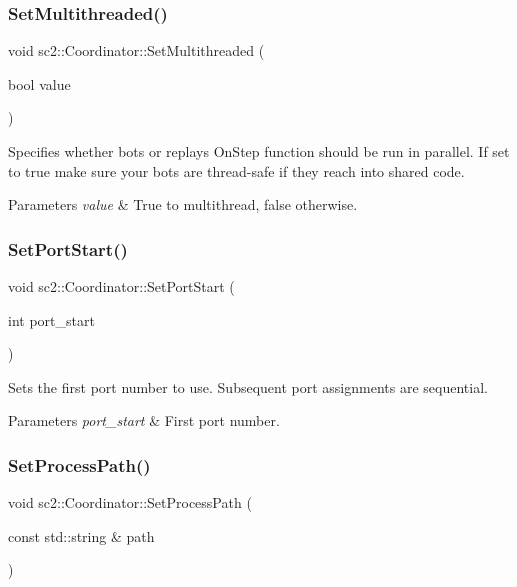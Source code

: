 \subsubsection{\texorpdfstring{Set\+Multithreaded()}{SetMultithreaded()}}
{\footnotesize\ttfamily void sc2\+::\+Coordinator\+::\+Set\+Multithreaded (\begin{DoxyParamCaption}\item[{bool}]{value }\end{DoxyParamCaption})}

Specifies whether bots or replays On\+Step function should be run in parallel. If set to true make sure your bots are thread-\/safe if they reach into shared code. 
\begin{DoxyParams}{Parameters}
{\em value} & True to multithread, false otherwise. \\
\hline
\end{DoxyParams}
\mbox{\label{classsc2_1_1_coordinator_aaad48921bac2f4f84471de5e9cff75d5}} 
\subsubsection{\texorpdfstring{Set\+Port\+Start()}{SetPortStart()}}
{\footnotesize\ttfamily void sc2\+::\+Coordinator\+::\+Set\+Port\+Start (\begin{DoxyParamCaption}\item[{int}]{port\+\_\+start }\end{DoxyParamCaption})}

Sets the first port number to use. Subsequent port assignments are sequential. 
\begin{DoxyParams}{Parameters}
{\em port\+\_\+start} & First port number. \\
\hline
\end{DoxyParams}
\mbox{\label{classsc2_1_1_coordinator_ad906656238e13a8bab21c46f50aecc3d}} 
\subsubsection{\texorpdfstring{Set\+Process\+Path()}{SetProcessPath()}}
{\footnotesize\ttfamily void sc2\+::\+Coordinator\+::\+Set\+Process\+Path (\begin{DoxyParamCaption}\item[{const std\+::string \&}]{path }\end{DoxyParamCaption})}

